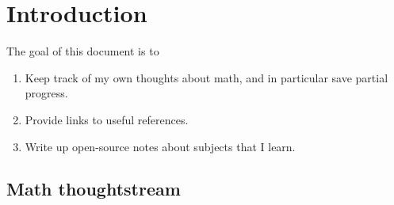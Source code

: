 \def\filepath{C:/Users/Owner/Dropbox/Math/templates}

\usepackage{showkeys}







\def\name{Math threads}



\pagestyle{fancy}
\chead{} 
\rhead{}%
\lfoot{} 
\cfoot{\thepage} 
\rfoot{} %
\renewcommand{\headrulewidth}{.3pt} 
\setlength\voffset{0in}
\setlength\textheight{648pt}


\maketitle

\tableofcontents

\chapter*{Introduction}

The goal of this document is to
\begin{enumerate}
\item
Keep track of my own thoughts about math, and in particular save partial progress.
\item 
Provide links to useful references.
\item
Write up open-source notes about subjects that I learn.
\end{enumerate}

\section{Math thoughtstream}

